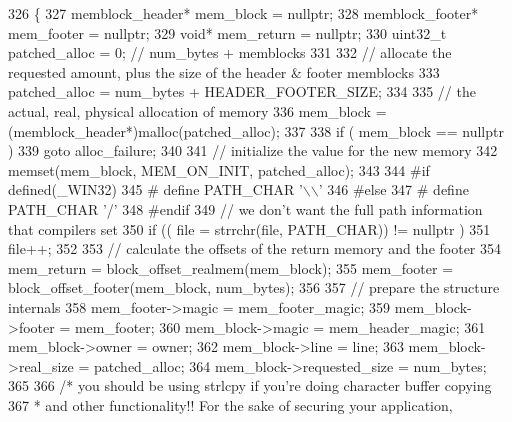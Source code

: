 \begin{DoxyCode}
326 \{
327         memblock_header*        mem\_block = \textcolor{keyword}{nullptr};
328         memblock_footer*        mem\_footer = \textcolor{keyword}{nullptr};
329         \textcolor{keywordtype}{void}*                   mem\_return = \textcolor{keyword}{nullptr};
330         uint32\_t                patched\_alloc = 0;      \textcolor{comment}{// num\_bytes + memblocks}
331 
332         \textcolor{comment}{// allocate the requested amount, plus the size of the header & footer memblocks}
333         patched\_alloc = num\_bytes + HEADER_FOOTER_SIZE;
334 
335         \textcolor{comment}{// the actual, real, physical allocation of memory}
336         mem\_block = (memblock_header*)malloc(patched\_alloc);
337 
338         \textcolor{keywordflow}{if} ( mem\_block == \textcolor{keyword}{nullptr} )
339                 \textcolor{keywordflow}{goto} alloc\_failure;
340 
341         \textcolor{comment}{// initialize the value for the new memory}
342         memset(mem\_block, MEM_ON_INIT, patched\_alloc);
343 
344 \textcolor{preprocessor}{#if defined(\_WIN32)
}
345 \textcolor{preprocessor}{}\textcolor{preprocessor}{#       define PATH\_CHAR        '\(\backslash\)\(\backslash\)'
}
346 \textcolor{preprocessor}{}\textcolor{preprocessor}{#else
}
347 \textcolor{preprocessor}{}\textcolor{preprocessor}{#       define PATH\_CHAR        '/'
}
348 \textcolor{preprocessor}{}\textcolor{preprocessor}{#endif
}
349 \textcolor{preprocessor}{}        \textcolor{comment}{// we don't want the full path information that compilers set}
350         \textcolor{keywordflow}{if} (( file = strrchr(file, PATH_CHAR)) != \textcolor{keyword}{nullptr} )
351                 file++;
352 
353         \textcolor{comment}{// calculate the offsets of the return memory and the footer}
354         mem\_return = block_offset_realmem(mem\_block);
355         mem\_footer = block_offset_footer(mem\_block, num\_bytes);
356 
357         \textcolor{comment}{// prepare the structure internals}
358         mem\_footer->magic       = mem_footer_magic;
359         mem\_block->footer       = mem\_footer;
360         mem\_block->magic        = mem_header_magic;
361         mem\_block->owner        = owner;
362         mem\_block->line         = line;
363         mem\_block->real_size            = patched\_alloc;
364         mem\_block->requested_size       = num\_bytes;
365 
366         \textcolor{comment}{/* you should be using strlcpy if you're doing character buffer copying
}
367 \textcolor{comment}{         * and other functionality!! For the sake of securing your application,
}
\end{DoxyCode}
